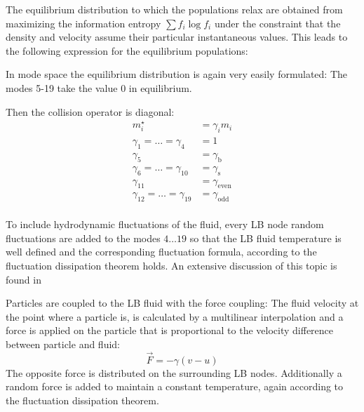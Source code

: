 The equilibrium distribution to which the populations relax 
are obtained from maximizing the information entropy 
$\sum f_i \log f_i$ under the constraint that the density
and velocity assume their particular instantaneous 
values. This leads to the following expression for the
equilibrium populations:

In mode space the equilibrium distribution is again very 
easily formulated: The modes 5-19 take the value 0 in equilibrium.

Then the collision operator is diagonal:
\begin{align*}
  m^\star_i &= \gamma_i m_i  \\
  \gamma_1=\dots=\gamma_4&=1 \\
  \gamma_5&=\gamma_\text{b} \\
  \gamma_6=\dots=\gamma_{10}&=\gamma_\text{s} \\
  \gamma_{11}&=\gamma_\text{even} \\
  \gamma_{12}=\dots = \gamma_{19}&=\gamma_\text{odd} \\
\end{align*}

To include hydrodynamic fluctuations of the fluid, every LB node 
random fluctuations are added to the modes $4\dots 19$ so that
the LB fluid temperature is well defined and the corresponding
fluctuation formula, according to the fluctuation dissipation theorem holds.
An extensive discussion of this topic is found in \cite{schiller08a}

Particles are coupled to the LB fluid with the force coupling:
The fluid velocity at the point where a particle is, is calculated 
by a multilinear interpolation and a force is applied on the particle
that is proportional to the velocity difference between particle 
and fluid:
\begin{equation}
  \vec{F} = - \gamma \left(v-u\right) 
\end{equation}
The opposite force is distributed on the surrounding LB nodes. Additionally
a random force is added to maintain a constant temperature, again according
to the fluctuation dissipation theorem.


